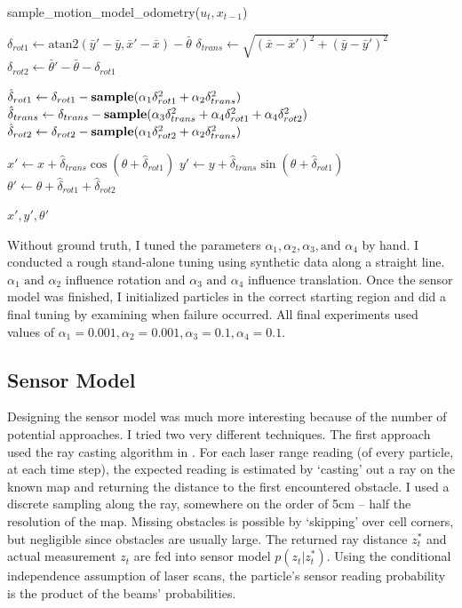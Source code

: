 \documentclass[11pt]{amsart}
\begin{document}
\begin{algorithm}
\caption{sample\_motion\_model\_odometry($u_t, x_{t-1}$)}\label{motion_model}
\begin{algorithmic}
\State $\delta_{rot1} \gets \text{atan2}(\bar y' - \bar y, \bar x' - \bar x) - \bar \theta$
\State $\delta_{trans} \gets \sqrt{(\bar x - \bar x')^2 + (\bar y - \bar  y')^2}$
\State $\delta_{rot2} \gets \bar \theta' - \bar \theta - \delta_{rot1}$
\vspace{1em}

\State $\hat \delta_{rot1} \gets \delta_{rot1} - \text{\bf{sample}}(\alpha_1\delta_{rot1}^2 + \alpha_2\delta_{trans}^2)$
\State $\hat \delta_{trans} \gets \delta_{trans} - \text{\bf{sample}}(\alpha_3\delta_{trans}^2 + \alpha_4\delta_{rot1}^2 + \alpha_4\delta_{rot2}^2)$
\State $\hat \delta_{rot2} \gets \delta_{rot2} - \text{\bf{sample}}(\alpha_1\delta_{rot2}^2 + \alpha_2\delta_{trans}^2)$
\vspace{1em}

\State $x' \gets x + \hat \delta_{trans}\cos(\theta + \hat \delta_{rot1})$
\State $y' \gets y + \hat \delta_{trans}\sin(\theta + \hat \delta_{rot1})$
\State $\theta' \gets \theta + \hat \delta_{rot1} + \hat \delta_{rot2}$
\vspace{1em}

 $x', y', \theta'$
\end{algorithmic}
\end{algorithm}

Without ground truth, I tuned the parameters $\alpha_1, \alpha_2, \alpha_3, \text{and } \alpha_4$ by hand. I conducted a rough stand-alone tuning using synthetic data along a straight line. $\alpha_1 \text{ and } \alpha_2$ influence rotation and $\alpha_3 \text{ and } \alpha_4$ influence translation. Once the sensor model was finished, I initialized particles in the correct starting region and did a final tuning by examining when failure occurred. All final experiments used values of $\alpha_1 = 0.001, \alpha_2 = 0.001, \alpha_3 = 0.1, \alpha_4 = 0.1$.

\subsection{Sensor Model}
Designing the sensor model was much more interesting because of the number of potential approaches. I tried two very different techniques. The first approach used the ray casting algorithm in \cite{thrun2005probabilistic}. For each laser range reading (of every particle, at each time step), the expected reading is estimated by `casting' out a ray on the known map and returning the distance to the first encountered obstacle. I used a discrete sampling along the ray, somewhere on the order of 5cm -- half the resolution of the map. Missing obstacles is possible by `skipping' over cell corners, but negligible since obstacles are usually large. The returned ray distance $z_t^*$ and actual measurement $z_t$ are fed into sensor model $p(z_t | z_t^*)$. Using the conditional independence assumption of laser scans, the particle's sensor reading probability is the product of the beams' probabilities.
\end{document}
